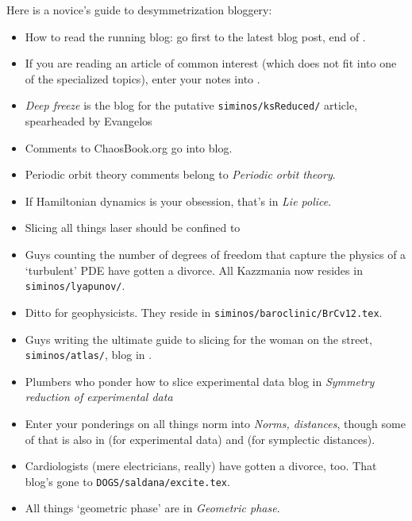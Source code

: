 Here is a novice's guide to desymmetrization bloggery:
\begin{itemize}
  \item
How to read the running blog: go first to the latest blog post, end
of .
  \item
If you are reading an article of common interest (which does not fit into
one of the specialized topics), enter your notes into .
  \item
{} \emph{Deep freeze} is the blog for the putative
\texttt{siminos/ksReduced/}
article, spearheaded by Evangelos
  \item
Comments to ChaosBook.org go into  blog.
  \item
Periodic orbit theory comments belong to  {\em
Periodic orbit theory}.
  \item
If Hamiltonian dynamics is your obsession, that's in
 {\em Lie police}.
  \item
Slicing all things laser should be confined to
  \item
Guys counting the number of degrees of freedom that capture the physics
of a `turbulent' PDE have gotten a divorce. All Kazzmania now resides in
\texttt{siminos/lyapunov/}.
  \item
Ditto for geophysicists. They reside in
\texttt{siminos/baroclinic/BrCv12.tex}.
  \item
Guys writing the ultimate guide to slicing for the woman on the street,
\texttt{siminos/atlas/}, blog in .
  \item
Plumbers who ponder how to slice experimental data blog in
 {\em Symmetry reduction of experimental data}
  \item
Enter your ponderings on all things norm into 
\emph{Norms, distances}, though some of that is also in 
(for experimental data) and  (for symplectic
distances).
  \item
Cardiologists (mere electricians, really) have gotten a divorce, too. That
blog's gone to \texttt{DOGS/saldana/excite.tex}.
  \item
All things `{geometric phase}' are in  {\em
Geometric phase}.

\end{itemize}






